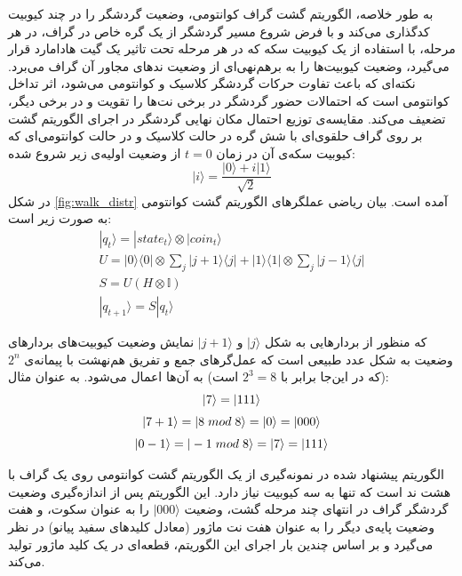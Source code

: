 به طور خلاصه، الگوریتم گشت گراف کوانتومی، وضعیت گردشگر را در چند کیوبیت کدگذاری می‌کند و با فرض شروع مسیر گردشگر از یک گره خاص در گراف، در هر مرحله، با استفاده از یک کیوبیت سکه که در هر مرحله تحت تاثیر یک گیت هادامارد قرار می‌گیرد، وضعیت کیوبیت‌ها را به برهم‌نهی‌ای از وضعیت ندهای مجاور آن گراف می‌برد. نکته‌ای که باعث تفاوت حرکات گردشگر کلاسیک و کوانتومی می‌شود، اثر تداخل کوانتومی است که احتمالات حضور گردشگر در برخی نت‌ها را تقویت و در برخی دیگر، تضعیف می‌کند.
مقایسه‌ی توزیع احتمال مکان نهایی گردشگر در اجرای الگوریتم گشت بر روی گراف حلقوی‌ای با شش گره در حالت کلاسیک و در حالت کوانتومی‌ای که کیوبیت سکه‌ی آن در زمان
$t=0$
از وضعیت اولیه‌ی زیر شروع شده:
\begin{equation}
    |i\rangle = \frac{|0\rangle + i|1\rangle}{\sqrt{2}}
\end{equation}
در شکل
\ref{fig:walk_distr}
آمده است.
بیان ریاضی عملگرهای الگوریتم گشت کوانتومی به صورت زیر است:
\begin{equation}
\begin{gathered}
    |q_t\rangle = |state_t\rangle \otimes |coin_t\rangle \\[3pt]
    U = |0\rangle \langle 0| \otimes \sum_j |j + 1\rangle \langle j| + |1\rangle \langle 1| \otimes \sum_j |j - 1\rangle
    \langle j| \\[3pt]
    S = U(H \otimes \mathbb{I}) \\[3pt]
    |q_{t+1}\rangle = S|q_t \rangle
\end{gathered}
\end{equation}

که منظور از بردارهایی به شکل
$|j\rangle$
و 
$|j+1\rangle$
نمایش وضعیت کیوبیت‌های بردارهای وضعیت به شکل عدد طبیعی است که عمل‌گرهای جمع و تفریق هم‌نهشت با پیمانه‌ی
$2^n$
(که در این‌جا برابر با 
$2^3 = 8$
است)
به آن‌ها اعمال می‌شود. به عنوان مثال:
\begin{equation}
    \begin{gathered}
        |7\rangle = |111\rangle \\[3pt]
        |7 + 1\rangle = |8 \hspace{1mm} mod \hspace{1mm} 8\rangle = |0\rangle = |000\rangle \\[3pt]
        |0 - 1\rangle = |-1 \hspace{1mm} mod \hspace{1mm} 8\rangle = |7\rangle = |111\rangle
    \end{gathered}
\end{equation}

الگوریتم پیشنهاد شده در 
\cite{miranda}
نمونه‌گیری از یک الگوریتم گشت کوانتومی روی یک گراف با هشت ند است که تنها به سه کیوبیت نیاز دارد. این الگوریتم پس از اندازه‌گیری وضعیت گردشگر گراف در انتهای چند مرحله گشت، وضعیت
$|000\rangle$
را به عنوان سکوت، و هفت وضعیت پایه‌ی دیگر را به عنوان هفت نت ماژور (معادل کلیدهای سفید پیانو) در نظر می‌گیرد و بر اساس چندین بار اجرای این الگوریتم، قطعه‌ای در یک کلید ماژور تولید می‌کند.
